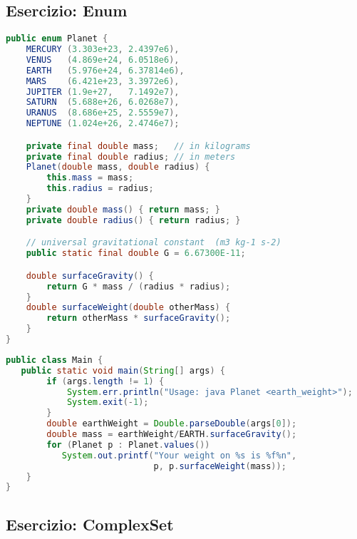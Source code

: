 \documentclass{article}
\begin{document}
\subsection{Esercizio: Enum}

\begin{lstlisting}[language=Java,escapechar=|]
public enum Planet {
    MERCURY (3.303e+23, 2.4397e6),
    VENUS   (4.869e+24, 6.0518e6),
    EARTH   (5.976e+24, 6.37814e6),
    MARS    (6.421e+23, 3.3972e6),
    JUPITER (1.9e+27,   7.1492e7),
    SATURN  (5.688e+26, 6.0268e7),
    URANUS  (8.686e+25, 2.5559e7),
    NEPTUNE (1.024e+26, 2.4746e7);

    private final double mass;   // in kilograms
    private final double radius; // in meters
    Planet(double mass, double radius) {
        this.mass = mass;
        this.radius = radius;
    }
    private double mass() { return mass; }
    private double radius() { return radius; }

    // universal gravitational constant  (m3 kg-1 s-2)
    public static final double G = 6.67300E-11;

    double surfaceGravity() {
        return G * mass / (radius * radius);
    }
    double surfaceWeight(double otherMass) {
        return otherMass * surfaceGravity();
    }
}
\end{lstlisting}

\begin{lstlisting}[language=Java,escapechar=|]
public class Main {
   public static void main(String[] args) {
        if (args.length != 1) {
            System.err.println("Usage: java Planet <earth_weight>");
            System.exit(-1);
        }
        double earthWeight = Double.parseDouble(args[0]);
        double mass = earthWeight/EARTH.surfaceGravity();
        for (Planet p : Planet.values())
           System.out.printf("Your weight on %s is %f%n",
                             p, p.surfaceWeight(mass));
    }
}
\end{lstlisting}


\subsection{Esercizio: ComplexSet}
\end{document}
